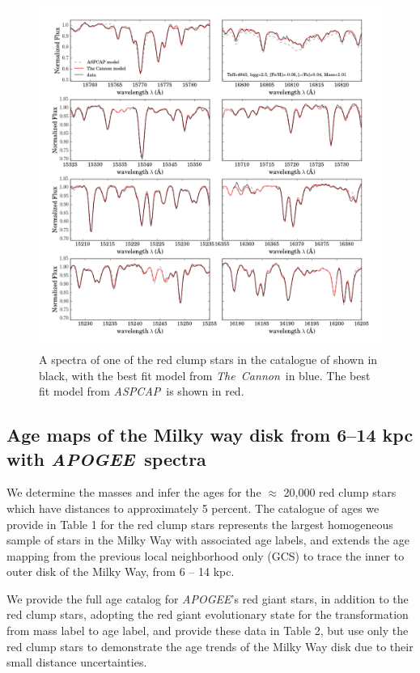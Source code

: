\documentclass[12pt, preprint]{aastex}
\newcommand{\project}[1]{\textsl{#1}}
\newcommand{\tc}{\project{The~Cannon}}
\newcommand{\apogee}{\project{APOGEE}}
\newcommand{\aspcap}{\project{ASPCAP}}
\begin{document}
\begin{figure}[h!]
\centering
      \includegraphics[scale=0.5]{./plots/spectra_fits_7.png}
  \caption{A spectra of one of the red clump stars in the catalogue of \citet{Bovy2014} shown in black, with the best fit model from \tc\ in blue. The best fit model from \aspcap\ is shown in red.}
\label{fig:spectra}
\end{figure}



\subsection{Age maps of the Milky way disk from 6--14 kpc with \apogee\ spectra}

We determine the masses and infer the ages for the $\approx$ 20,000 red clump stars which have distances to approximately 5 percent. The catalogue of ages we provide in Table 1 for the red clump stars represents the largest homogeneous sample of stars in the Milky Way with associated age labels, and extends the age mapping from the previous local neighborhood only (GCS) to trace the inner to outer disk of the Milky Way, from 6 -- 14 kpc.  

We provide the full age catalog for \apogee's red giant stars, in addition to the red clump stars, adopting the red giant evolutionary state for the transformation from mass label to age label, and provide these data in Table 2, but use only the red clump stars to demonstrate the age trends of the Milky Way disk due to their small distance uncertainties. 
\end{document}
